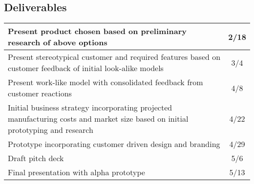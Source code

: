 \documentclass[8pt]{article}
\begin{document}
\subsection*{Deliverables}


\begin{tabular}{>{\RaggedLeft}p{6in} | c}
Present product chosen based on preliminary research of above options & 2/18 \\ \hline
Present stereotypical customer and required features based on customer feedback of initial look-alike models & 3/4 \\ \hline
Present work-like model with consolidated feedback from customer reactions & 4/8 \\ \hline
Initial business strategy incorporating projected manufacturing costs and market
size based on initial prototyping and research& 4/22 \\ \hline
Prototype incorporating customer driven design and branding & 4/29 \\ \hline
Draft pitch deck & 5/6 \\ \hline
Final presentation with alpha prototype & 5/13 \\ 

\end{tabular}

\end{document}

